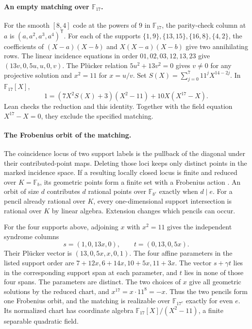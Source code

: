 \paragraph{An empty matching over \(\mathbb F_{17}\).}
For the smooth \([8,4]\) code at the powers of \(9\) in \(\mathbb F_{17}\),
the parity-check column at \(a\) is \((a,a^2,a^3,a^4)^{\mathsf T}\).
For each of the supports \(\{1,9\},\{13,15\},\{16,8\},\{4,2\}\), the
coefficients of \((X-a)(X-b)\) and \(X(X-a)(X-b)\) give two annihilating rows.
The linear incidence equations in order \(01,02,03,12,13,23\) give
\((13v,0,5u,u,0,v)\). The Pl\"ucker relation \(5u^2+13v^2=0\) gives
\(v\ne0\) for any projective solution and \(x^2=11\) for \(x=u/v\).
Set \(S(X)=\sum_{j=0}^{7}11^j X^{14-2j}\). In \(\mathbb F_{17}[X]\),
\[
  1=(7X^2S(X)+3)(X^2-11)+10X(X^{17}-X).
\]
Lean checks the reduction and this identity. Together with the field
equation \(X^{17}-X=0\), they exclude the specified matching.

\paragraph{The Frobenius orbit of the matching.}
The coincidence locus of two support labels is the pullback of the
diagonal under their contributed-point maps. Deleting those loci keeps
only distinct points in the marked incidence space. If a resulting
locally closed locus is finite and reduced over \(K=\mathbb F_b\), its
geometric points form a finite set with a Frobenius action
\cite{stacksEtalePoint}. An orbit of size \(d\) contributes \(d\) rational
points over \(\mathbb F_{b^e}\) exactly when \(d\mid e\). For a pencil
already rational over \(K\), every one-dimensional support intersection
is rational over \(K\) by linear algebra. Extension changes which pencils
can occur.

For the four supports above, adjoining \(x\) with \(x^2=11\) gives
the independent syndrome columns
\[
 s=(1,0,13x,0),\qquad t=(0,13,0,5x).
\]
Their Pl\"ucker vector is \((13,0,5x,x,0,1)\). The four affine
parameters in the listed support order are \(7+12x,6+14x,10+5x,11+3x\).
The vector \(s+\gamma t\) lies in the corresponding support span at
each parameter, and \(t\) lies in none of those four spans. The parameters
are distinct. The two choices of \(x\) give all geometric solutions by
the reduced chart, and \(x^{17}=x\cdot 11^8=-x\). Thus the two pencils
form one Frobenius orbit, and the matching is realizable over
\(\mathbb F_{17^e}\) exactly for even \(e\).
Its normalized chart has coordinate algebra
\(\mathbb F_{17}[X]/(X^2-11)\), a finite separable quadratic field.

